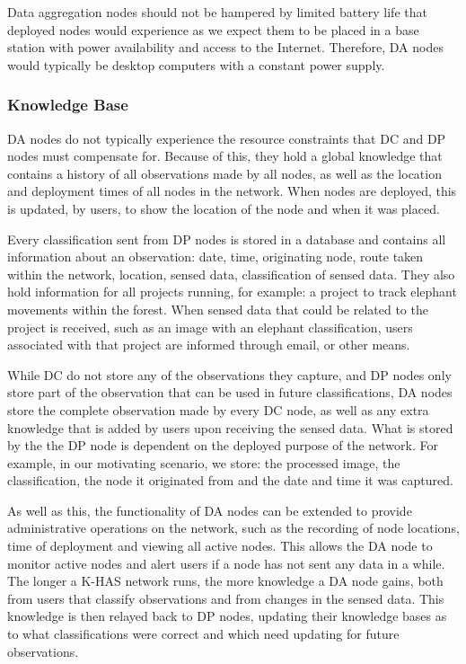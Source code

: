 	Data aggregation nodes should not be hampered by limited battery life that deployed nodes would experience as we expect them to be placed in a base station with power availability and access to the Internet. Therefore, DA nodes would typically be desktop computers with a constant power supply.
	
	\subsubsection{Knowledge Base}
	DA nodes do not typically experience the resource constraints that DC and DP nodes must compensate for. Because of this, they hold a global knowledge that contains a history of all observations made by all nodes, as well as the location and deployment times of all nodes in the network. When nodes are deployed, this is updated, by users, to show the location of the node and when it was placed. 

	Every classification sent from DP nodes is stored in a database and contains all information about an observation: date, time, originating node, route taken within the network, location, sensed data, classification of sensed data. They also hold information for all projects running, for example: a project to track elephant movements within the forest. When sensed data that could be related to the project is received, such as an image with an elephant classification, users associated with that project are informed through email, or other means.
	
	While DC do not store any of the observations they capture, and DP nodes only store part of the observation that can be used in future classifications, DA nodes store the complete observation made by every DC node, as well as any extra knowledge that is added by users upon receiving the sensed data. What is stored by the the DP node is dependent on the deployed purpose of the network. For example, in our motivating scenario, we store: the processed image, the classification, the node it originated from and the date and time it was captured.
	
	As well as this, the functionality of DA nodes can be extended to provide administrative operations on the network, such as the recording of node locations, time of deployment and viewing all active nodes. This allows the DA node to monitor active nodes and alert users if a node has not sent any data in a while. The longer a K-HAS network runs, the more knowledge a DA node gains, both from users that classify observations and from changes in the sensed data. This knowledge is then relayed back to DP nodes, updating their knowledge bases as to what classifications were correct and which need updating for future observations.

